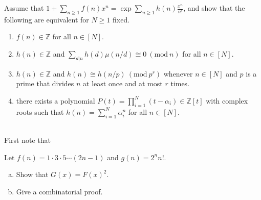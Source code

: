 \documentclass{article}
\newenvironment{problem}[2][Problem]{\begin{trivlist}
\item[\hskip \labelsep {\bfseries #1}\hskip \labelsep {\bfseries #2.}]}{\end{trivlist}}
\newenvironment{solution}[1][Solution.]{\begin{trivlist}
\item[\hskip \labelsep {\bfseries #1}]}{\end{trivlist}}
\begin{document}
\pagebreak
%
%
\begin{problem}{3}
  Assume that $\displaystyle 1 + \sum_{n\geq1}f(n)x^n = \exp\sum_{n\geq1}h(n)\frac{x^n}{n!}$,
  and show that the following are equivalent for $N \geq 1$ fixed.
  \begin{enumerate}
    \item $f(n) \in \mathbb Z$ for all $n \in [N]$.
    \item $h(n) \in \mathbb Z$ and
      $\sum_{d|n} h(d)\mu(n/d) \cong 0\ (\mathrm{mod}\ n)$ for all $n \in [N]$.
    \item $h(n) \in \mathbb Z$ and $h(n) \cong  h(n/p)\ (\mathrm{mod}\ p^r)$
      whenever $n \in [N]$ and $p$ is a prime that divides $n$ at least once
      and at most $r$ times.
    \item there exists a polynomial
      $P(t) = \prod_{i=1}^N (t-\alpha_i) \in \mathbb Z[t]$ with complex roots
      such that $h(n) = \sum_{i=1}^N \alpha_i^n$ for all $n \in [N]$.
  \end{enumerate}
\end{problem}

\begin{solution} \text{} \\
  First note that $ $
\end{solution}
\pagebreak
%
%
\begin{problem}{4}
  Let $f(n) = 1 \cdot 3 \cdot 5 \cdots (2n-1)$ and $g(n) = 2^nn!$.
  \begin{enumerate}[(a)]
    \item Show that $G(x) = F(x)^2$.
    \item Give a combinatorial proof.
  \end{enumerate}
\end{problem}
\end{document}
